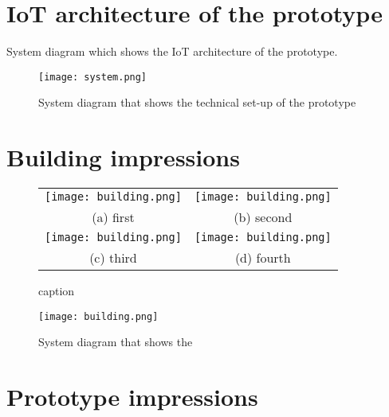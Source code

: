 \begin{appendices}
\section{IoT architecture of the prototype}
\label{appendix:architecture}

System diagram which shows the IoT architecture of the prototype.

\begin{figure}[H]
    \centering
    \texttt{[image: system.png]}
    \caption{System diagram that shows the technical set-up of the prototype}
    \label{fig:timeline}
\end{figure}

\pagebreak

\section{Building impressions}
\label{appendix:building}

\begin{figure}[H]
\begin{minipage}{.5\textwidth}
\begin{tabular}{cc}
  \texttt{[image: building.png]} &   \texttt{[image: building.png]} \\
(a) first & (b) second \\[6pt]
 \texttt{[image: building.png]} &   \texttt{[image: building.png]} \\
(c) third & (d) fourth \\[6pt]
\end{tabular}
\caption{caption}
\end{minipage}%
\begin{minipage}{.5\textwidth}
    \centering
    \texttt{[image: building.png]}
    \caption{System diagram that shows the }
    \label{fig:timeline}
\end{minipage}%
\end{figure}

\section{Prototype impressions}
\label{appendix:prototype}


\end{appendices}
